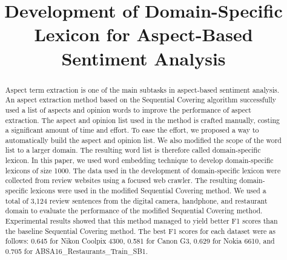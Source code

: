 \documentclass[a4paper,conference]{IEEEtran}
\begin{document}
\title{Development of Domain-Specific Lexicon for Aspect-Based Sentiment Analysis\\
}

\author{
}

\author{
}

\maketitle

\begin{abstract}
Aspect term extraction is one of the main subtasks in aspect-based sentiment analysis. An aspect extraction method based on the Sequential Covering algorithm \cite{b2} successfully used a list of aspects and opinion words to improve the performance of aspect extraction. The aspect and opinion list used in the method is crafted manually, costing a significant amount of time and effort. To ease the effort, we proposed a way to automatically build the aspect and opinion list. We also modified the scope of the word list to a larger domain. The resulting word list is therefore called domain-specific lexicon. In this paper, we used word embedding technique to develop domain-specific lexicons of size 1000. The data used in the development of domain-specific lexicon were collected from review websites using a focused web crawler. The resulting domain-specific lexicons were used in the modified Sequential Covering method. We used a total of 3,124 review sentences from the digital camera, handphone, and restaurant domain to evaluate the performance of the modified Sequential Covering method. Experimental results showed that this method managed to yield better F1 scores than the baseline Sequential Covering method. The best F1 scores for each dataset were as follows: 0.645 for Nikon Coolpix 4300, 0.581 for Canon G3, 0.629 for Nokia 6610, and 0.705 for ABSA16\_Restaurants\_Train\_SB1.
\end{abstract}
\end{document}
